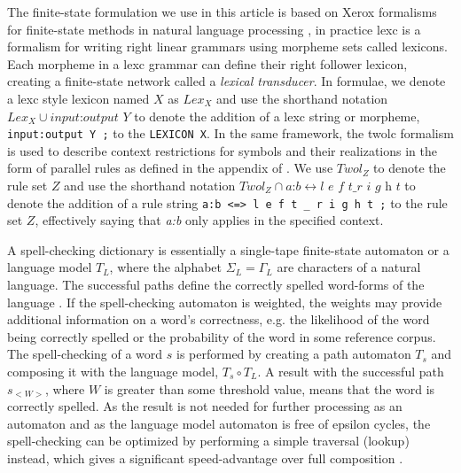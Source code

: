 \documentclass[postprint]{flammie}
\begin{document}
The finite-state formulation we use in this article is based on Xerox
formalisms for finite-state methods in natural language processing
\cite{beesley/2003}, in practice lexc is a formalism for writing right linear
grammars using morpheme sets called lexicons. Each morpheme in a lexc grammar
can define their right follower lexicon, creating a finite-state network called
a \emph{lexical transducer}. In formulae, we denote a lexc style lexicon named $X$ as
$Lex_X$ and use the shorthand notation $Lex_X \cup \textit{input:output Y}$ to
denote the addition of a lexc string or morpheme, \texttt{input:output Y ;} to
the \texttt{LEXICON X}.  In the same framework, the twolc formalism is used to
describe context restrictions for symbols and their realizations in the form of
parallel rules as defined in the appendix of \cite{beesley/2003}. We use
$Twol_Z$ to denote the rule set $Z$ and use the shorthand notation $Twol_Z \cap
\textit{a:b} \leftrightarrow \textit{l e f t} \_ \textit{r i g h t}$ to denote
the addition of a rule string \texttt{a:b <=> l e f t \_ r i g h t ;} to the
rule set $Z$, effectively saying that \textit{a:b} only applies in
the specified context.

A spell-checking dictionary is essentially a single-tape finite-state
automaton or a language model $T_L$, where the alphabet $\Sigma_L =
\Gamma_L$ are characters of a natural language. The successful paths
define the correctly spelled word-forms of the language
\cite{conf/lrec/Pirinen2010}. If the spell-checking automaton is
weighted, the weights may provide additional information on a word's
correctness, e.g. the likelihood of the word being correctly spelled
or the probability of the word in some reference corpus. The
spell-checking of a word $s$ is performed by creating a path automaton
$T_s$ and composing it with the language model, $T_s \circ T_L$. A
result with the successful path $s_{<W>}$, where $W$ is greater than
some threshold value, means that the word is correctly spelled. As the
result is not needed for further processing as an automaton and as the language model
automaton is free of epsilon cycles, the spell-checking can be
optimized by performing a simple traversal (lookup) instead, which
gives a significant speed-advantage over full composition
\cite{conf/fsmnlp/Silfverberg2009}.
\end{document}

